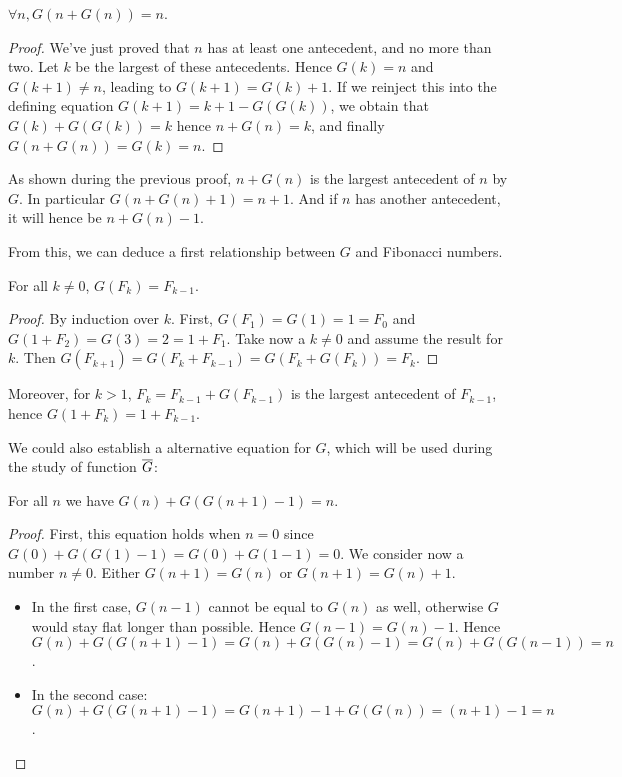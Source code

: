 \documentclass[a4paper,11pt]{article}
\begin{document}
\begin{theorem}\label{Gonto}
$\forall n, G(n+G(n))=n$.
\end{theorem}
\begin{proof}
We've just proved that $n$ has at least one antecedent, and
no more than two. Let $k$ be the largest of these antecedents.
Hence $G(k)=n$ and $G(k+1)\neq n$, leading to $G(k+1)=G(k)+1$.
If we reinject this into the defining equation $G(k+1) = k+1 -
G(G(k))$, we obtain that $G(k)+G(G(k))=k$ hence $n+G(n)=k$,
and finally $G(n+G(n))=G(k)=n$.
\end{proof}

As shown during the previous proof, $n+G(n)$ is the largest antecedent
of $n$ by $G$. In particular $G(n+G(n)+1)=n+1$. And if $n$ has another
antecedent, it will hence be $n+G(n)-1$.

From this, we can deduce a first relationship between $G$ and
Fibonacci numbers.
\begin{theorem}\label{Gfib} For all $k\neq0$, $G(F_k)=F_{k-1}$.
\end{theorem}
\begin{proof}By induction over $k$. First, $G(F_1)=G(1)=1=F_0$
and $G(1+F_2)=G(3)=2=1+F_1$. Take now a $k\neq 0$ and assume the
result for $k$. Then $G(F_{k+1})=G(F_k+F_{k-1})=G(F_k+G(F_k))=F_k$.
\end{proof}

Moreover, for $k>1$, $F_k = F_{k-1}+G(F_{k-1})$ is the largest antecedent of
$F_{k-1}$, hence $G(1+F_k)=1+F_{k-1}$.

We could also establish a alternative equation for $G$, which will be
used during the study of function $\overline{G}$:

\begin{theorem}\label{Galt} For all $n$ we have $G(n) + G(G(n+1)-1) = n$.
\end{theorem}
\begin{proof}
First, this equation holds when $n=0$ since
$G(0)+G(G(1)-1) = G(0) + G(1-1) = 0$.
We consider now a number $n\neq 0$. Either $G(n+1)=G(n)$ or $G(n+1)=G(n)+1$.
\begin{itemize}
\item In the first case, $G(n-1)$ cannot be equal to $G(n)$ as well,
otherwise $G$ would stay flat longer than possible. Hence $G(n-1)=G(n)-1$.
Hence $G(n)+G(G(n+1)-1) = G(n) + G(G(n)-1) = G(n)+G(G(n-1)) = n$.
\item In the second case:
$G(n) + G(G(n+1)-1) = G(n+1)-1 + G(G(n)) = (n+1)-1 = n$.
\end{itemize}
\end{proof}
\end{document}
